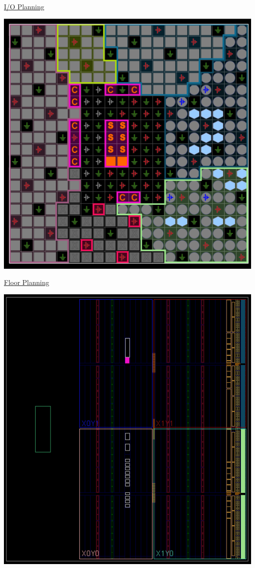 \documentclass[11pt]{article}
\begin{document}
\begin{center}
    \newpage

    \underline{I/O Planning}

    \includegraphics[width = 1\textwidth]{ioplan.png}
    \newpage

    \underline{Floor Planning}

    \includegraphics[width = 1\textwidth]{floorplan.png}


\end{center}
\end{document}
